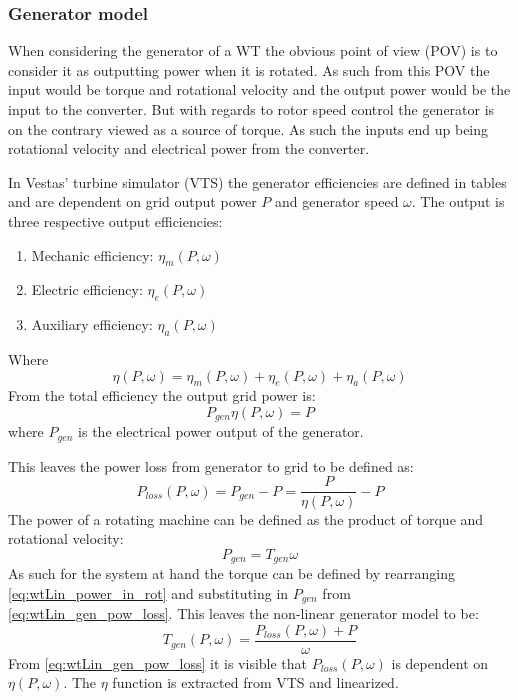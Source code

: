 \subsubsection{Generator model}
When considering the generator of a WT the obvious point of view (POV) is to consider it as outputting power when it is rotated. As such from this POV the input would be torque and rotational velocity and the output power would be the input to the converter. But with regards to rotor speed control the generator is on the contrary viewed as a source of torque. As such the inputs end up being rotational velocity and electrical power from the converter.

In Vestas' turbine simulator (VTS) the generator efficiencies are defined in tables and are dependent on grid output power $ P $ and generator speed $ \omega $. The output is three respective output efficiencies: 
\begin{enumerate}
	\item Mechanic efficiency: $ \eta_m(P,\omega) $
	\item Electric efficiency: $ \eta_e(P,\omega) $
	\item Auxiliary efficiency: $ \eta_a(P,\omega) $
\end{enumerate}
Where 
\begin{equation}\label{eq:wtLin_gen_effi}
	\eta(P,\omega) = \eta_m(P,\omega) + \eta_e(P,\omega) + \eta_a(P,\omega)
\end{equation}
From the total efficiency the output grid power is:
\begin{equation}\label{eq:wtLin_gen_elec_pow}
	P_{gen} \eta(P,\omega) = P
\end{equation}
where $ P_{gen} $ is the electrical power output of the generator.

This leaves the power loss from generator to grid to be defined as:
\begin{equation} \label{eq:wtLin_gen_pow_loss}
	P_{loss}(P, \omega) = P_{gen} - P = \dfrac{P}{\eta(P, \omega)} - P
\end{equation}
The power of a rotating machine can be defined as the product of torque and rotational velocity:
\begin{equation}\label{eq:wtLin_power_in_rot}
	P_{gen} = T_{gen} \omega
\end{equation}
As such for the system at hand the torque can be defined by rearranging \cref{eq:wtLin_power_in_rot} and substituting in $ P_{gen} $ from \cref{eq:wtLin_gen_pow_loss}. This leaves the non-linear generator model to be:
\begin{equation}\label{key}
	T_{gen}(P, \omega) = \dfrac{P_{loss}(P, \omega) + P}{\omega}
\end{equation}
From \cref{eq:wtLin_gen_pow_loss} it is visible that $ P_{loss}(P,\omega) $ is dependent on $ \eta(P, \omega) $. The $ \eta $ function is extracted from VTS and linearized.

